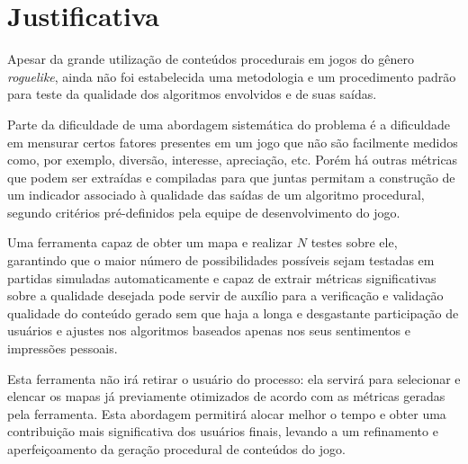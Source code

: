 \chapter[Justificativa]{Justificativa}

Apesar da grande utilização de conteúdos procedurais em jogos do gênero \textit{roguelike}, ainda não foi estabelecida uma metodologia e um procedimento padrão para teste da qualidade dos algoritmos envolvidos e de suas saídas.

Parte da dificuldade de uma abordagem sistemática do problema é a dificuldade em mensurar certos fatores presentes em um jogo que não são facilmente medidos como, por exemplo, diversão, interesse, apreciação, etc. Porém há outras métricas que podem ser extraídas e compiladas para que juntas permitam a construção de um indicador associado à qualidade das saídas de um algoritmo procedural, segundo critérios pré-definidos pela equipe de desenvolvimento do jogo.

Uma ferramenta capaz de obter um mapa e realizar $N$ testes sobre ele, garantindo que o maior número de possibilidades possíveis sejam testadas em partidas simuladas automaticamente e capaz de extrair métricas significativas sobre a qualidade desejada pode servir de auxílio para a verificação e validação qualidade do conteúdo gerado sem que haja a longa e desgastante participação de usuários e ajustes nos algoritmos baseados apenas nos seus sentimentos e impressões pessoais.

Esta ferramenta não irá retirar o usuário do processo: ela servirá para selecionar e elencar  os mapas já previamente otimizados de acordo com as métricas geradas pela ferramenta. Esta abordagem permitirá alocar melhor o tempo e obter uma contribuição mais significativa dos usuários finais, levando a um refinamento e aperfeiçoamento da geração procedural de conteúdos do jogo.

